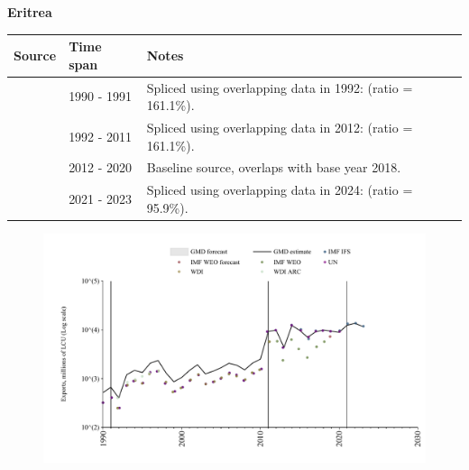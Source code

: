 \documentclass[12pt,a4paper,landscape]{article}
\begin{document}
\begin{adjustbox}{max totalsize={\paperwidth}{\paperheight},center}
\begin{minipage}[t][\textheight][t]{\textwidth}
\vspace*{0.5cm}
{}
\begin{center}
{\Large\bfseries Eritrea}
\end{center}
\vspace{0.5cm}
\begin{table}[H]
\centering
\small
\begin{tabular}{|l|l|l|}
\hline
\textbf{Source} & \textbf{Time span} & \textbf{Notes} \\
\hline
\rowcolor{white}\cite{UN}& 1990 - 1991 &Spliced using overlapping data in 1992: (ratio = 161.1\%).\\
\rowcolor{lightgray}\cite{WDI}& 1992 - 2011 &Spliced using overlapping data in 2012: (ratio = 161.1\%).\\
\rowcolor{white}\cite{UN}& 2012 - 2020 &Baseline source, overlaps with base year 2018.\\
\rowcolor{lightgray}\cite{IMF_IFS}& 2021 - 2023 &Spliced using overlapping data in 2024: (ratio = 95.9\%).\\
\hline
\end{tabular}
\end{table}
\begin{figure}[H]
\centering
\includegraphics[width=\textwidth,height=0.6\textheight,keepaspectratio]{graphs/ERI_exports.pdf}
\end{figure}
\end{minipage}
\end{adjustbox}
\end{document}
